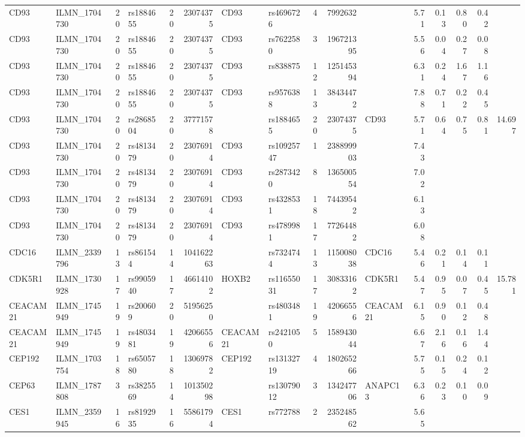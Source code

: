 \documentclass{article}
\begin{document}
\begin{landscape}
{\begin{ThreePartTable}
\begin{longtable}{|llr|lrrl|lrrl|rrrr|r|}
CD93 & ILMN\_1704730 & 20 & rs1884655 & 20 & 23074375 & CD93 & rs4696726 & 4 & 7992632 &  & 5.71 & 0.13 & 0.80 & 0.42 &  \\
CD93 & ILMN\_1704730 & 20 & rs1884655 & 20 & 23074375 & CD93 & rs7622580 & 3 & 196721395 &  & 5.56 & 0.04 & 0.27 & 0.08 &  \\
CD93 & ILMN\_1704730 & 20 & rs1884655 & 20 & 23074375 & CD93 & rs838875 & 12 & 125145394 &  & 6.31 & 0.24 & 1.67 & 1.16 &  \\
CD93 & ILMN\_1704730 & 20 & rs1884655 & 20 & 23074375 & CD93 & rs9576388 & 13 & 38434472 &  & 7.88 & 0.71 & 0.22 & 0.45 &  \\
CD93 & ILMN\_1704730 & 20 & rs2868504 & 20 & 37771578 &  & rs1884655 & 20 & 23074375 & CD93 & 5.71 & 0.64 & 0.75 & 0.81 & 14.697 \\
CD93 & ILMN\_1704730 & 20 & rs4813479 & 20 & 23076914 & CD93 & rs10925747 & 1 & 238899903 &  & 7.43 &  &  &  &  \\
CD93 & ILMN\_1704730 & 20 & rs4813479 & 20 & 23076914 & CD93 & rs2873420 & 8 & 136500554 &  & 7.02 &  &  &  &  \\
CD93 & ILMN\_1704730 & 20 & rs4813479 & 20 & 23076914 & CD93 & rs4328531 & 18 & 74439542 &  & 6.13 &  &  &  &  \\
CD93 & ILMN\_1704730 & 20 & rs4813479 & 20 & 23076914 & CD93 & rs4789981 & 17 & 77264482 &  & 6.08 &  &  &  &  \\
CDC16 & ILMN\_2339796 & 13 & rs861544 & 14 & 104162263 &  & rs7324744 & 13 & 115008038 & CDC16 & 5.46 & 0.21 & 0.14 & 0.11 &  \\
CDK5R1 & ILMN\_1730928 & 17 & rs9905940 & 17 & 46614102 & HOXB2 & rs11655031 & 17 & 30833162 & CDK5R1 & 5.47 & 0.95 & 0.07 & 0.45 & 15.781 \\
CEACAM21 & ILMN\_1745949 & 19 & rs200609 & 20 & 51956250 &  & rs4803481 & 19 & 42066556 & CEACAM21 & 6.15 & 0.90 & 0.12 & 0.48 &  \\
CEACAM21 & ILMN\_1745949 & 19 & rs4803481 & 19 & 42066556 & CEACAM21 & rs2421050 & 5 & 158943044 &  & 6.67 & 2.16 & 0.16 & 1.44 &  \\
CEP192 & ILMN\_1703754 & 18 & rs6505780 & 18 & 13069782 & CEP192 & rs13132719 & 4 & 180265266 &  & 5.75 & 0.15 & 0.24 & 0.12 &  \\
CEP63 & ILMN\_1787808 & 3 & rs3825569 & 14 & 101350298 &  & rs13079012 & 3 & 134247706 & ANAPC13 & 6.36 & 0.23 & 0.10 & 0.09 &  \\
CES1 & ILMN\_2359945 & 16 & rs8192935 & 16 & 55861794 & CES1 & rs772788 & 2 & 235248562 &  & 5.65 &  &  &  &  \\

\end{longtable}
\end{ThreePartTable}}
\end{landscape}
\end{document}
